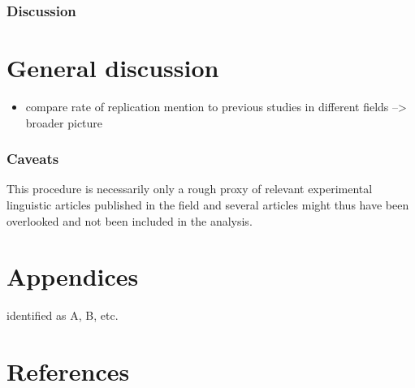 \documentclass[]{elsarticle} %
\providecommand{\tightlist}{%
  \setlength{\itemsep}{0pt}\setlength{\parskip}{0pt}}
\begin{document}
\hypertarget{discussion-1}{%
\subsubsection{Discussion}\label{discussion-1}}

\hypertarget{general-discussion}{%
\section{General discussion}\label{general-discussion}}

\begin{itemize}
\tightlist
\item
  compare rate of replication mention to previous studies in different
  fields --\textgreater{} broader picture
\end{itemize}

\hypertarget{caveats}{%
\subsubsection{Caveats}\label{caveats}}

This procedure is necessarily only a rough proxy of relevant
experimental linguistic articles published in the field and several
articles might thus have been overlooked and not been included in the
analysis.

\hypertarget{appendices}{%
\section{Appendices}\label{appendices}}

identified as A, B, etc.

\hypertarget{references}{%
\section*{References}\label{references}}
\end{document}
